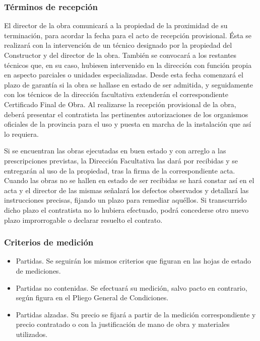 \documentclass[../main.tex]{subfiles}
\begin{document}
\subsubsection{Términos de recepción}
El director de la obra comunicará a la propiedad de la proximidad de su terminación, para acordar la fecha para el acto de recepción provisional. Ésta se realizará con la intervención de un técnico designado por la propiedad del Constructor y del director de la obra. También se convocará a los restantes técnicos que, en su caso, hubiesen intervenido en la dirección con función propia en aspecto parciales o unidades especializadas. Desde esta fecha comenzará el plazo de garantía si la obra se hallase en estado de ser admitida, y seguidamente con los técnicos de la dirección facultativa extenderán el correspondiente Certificado Final de Obra. Al realizarse la recepción provisional de la obra, deberá presentar el contratista las pertinentes autorizaciones de los organismos oficiales de la provincia para el uso y puesta en marcha de la instalación que así lo requiera. \par
\vspace{0.5 cm}
Si se encuentran las obras ejecutadas en buen estado y con arreglo a las prescripciones previstas, la Dirección Facultativa las dará por recibidas y se entregarán al uso de la propiedad, tras la firma de la correspondiente acta. Cuando las obras no se hallen en estado de ser recibidas se hará constar así en el acta y el director de las mismas señalará los defectos observados y detallará las instrucciones precisas, fijando un plazo para remediar aquéllos. Si transcurrido dicho plazo el contratista no lo hubiera efectuado, podrá concederse otro nuevo plazo improrrogable o declarar resuelto el contrato.

\subsubsection{Criterios de medición}
\begin{itemize}
    \item Partidas. Se seguirán los mismos criterios que figuran en las hojas de estado de mediciones.
    \item Partidas no contenidas. Se efectuará su medición, salvo pacto en contrario, según figura en el Pliego General de Condiciones.
    \item Partidas alzadas. Su precio se fijará a partir de la medición correspondiente y precio contratado o con la justificación de mano de obra y materiales utilizados.
\end{itemize}
\end{document}
